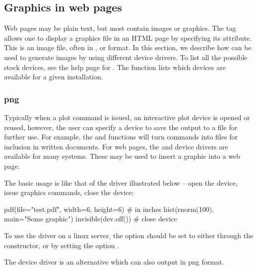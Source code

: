 \subsection{Graphics in web pages}
\label{sec:graphics-web-pages}
Web pages may be plain text, but most contain images or graphics. The
 tag allows one to display a graphics file in an HTML
page by specifying its  attribute. This is an image file,
often in ,  or  format. In this
section, we describe how \R\/ can be used to generate images by using
different device drivers. To list all the possible stock devices, see the
help page for . The function  lists
which devices are available for a given \R\/ installation.

\subsubsection{png}
\label{sec:images}
Typically when a plot command is issued, an interactive plot device is
opened or reused, however, the user can specify a device to save the
output to a file for further use. For example, the  and
 functions will turn \R\/ commands into files for
inclusion in written documents. For web pages, the  and
 device drivers are available for many systems. These
may be used to insert a graphic into a web page.

The basic usage is like that of the  driver illustrated
below -- open the device, issue graphics commands, close the device:
\begin{Schunk}
\begin{Sinput}
 pdf(file="test.pdf", width=6, height=6) # in inches
 hist(rnorm(100), main="Some graphic")
 invisible(dev.off())                    # close device
\end{Sinput}
\end{Schunk}

To use the  driver on a linux server, the option 
should be set to  either through the constructor, or by
setting the option . 

The  device driver is an alternative which can also output
in png format.


